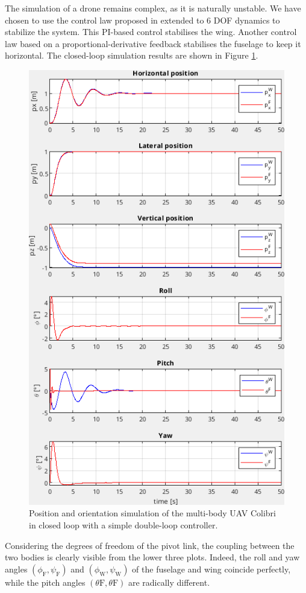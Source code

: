 The simulation of a drone remains complex, as it is naturally unstable. We have chosen to use the control law proposed in \cite{SANSOU20221} extended to 6 DOF dynamics to stabilize the system. This PI-based control stabilises the wing. Another control law based on a proportional-derivative feedback stabilises the fuselage to keep it horizontal. The closed-loop simulation results are shown in Figure \ref{fig:sim_colibri}.
\begin{figure}[!h]
\centering
    \includegraphics[width=1\columnwidth,angle=0]{figures/colibri_sim.png}
    \caption{Position and orientation simulation of the multi-body UAV Colibri in closed loop with a simple double-loop controller. }
    \label{fig:sim_colibri}
\end{figure}
Considering the degrees of freedom of the pivot link, the coupling between the two bodies is clearly visible from the lower three plots. Indeed, the roll and yaw angles $(\phi_{\text{F}}, \psi_{\text{F}})$ and $(\phi_{\text{W}}, \psi_{\text{W}})$ of the fuselage and wing coincide perfectly, while the pitch angles $(\theta{\text{F}}, \theta{\text{F}})$ are radically different.

